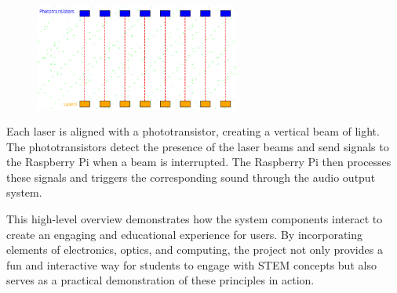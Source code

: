 \begin{figure}[h!]
	\centering
   	\includegraphics[width=0.60\textwidth]{images/Design.png}
\end{figure}

Each laser is aligned with a phototransistor, creating a vertical beam of light. The phototransistors detect the presence of the laser beams and send signals to the Raspberry Pi when a beam is interrupted. The Raspberry Pi then processes these signals and triggers the corresponding sound through the audio output system.

This high-level overview demonstrates how the system components interact to create an engaging and educational experience for users. By incorporating elements of electronics, optics, and computing, the project not only provides a fun and interactive way for students to engage with STEM concepts but also serves as a practical demonstration of these principles in action.
